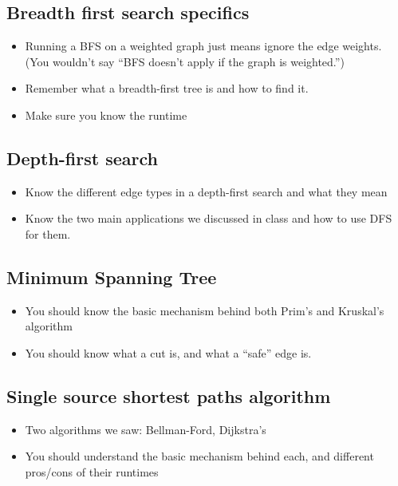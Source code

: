 \documentclass[11  pt]{exam}
\begin{document}
	\subsection{Breadth first search specifics}

	\begin{itemize}	
		\item Running a BFS on a weighted graph just means ignore the edge weights. (You wouldn't say ``BFS doesn't apply if the graph is weighted.'')
		\item Remember what a breadth-first tree is and how to find it.
		\item Make sure you know the runtime
	\end{itemize}


	\subsection{Depth-first search}
		\begin{itemize}	
			\item Know the different edge types in a depth-first search and what they mean
			\item Know the two main applications we discussed in class and how to use DFS for them.
		\end{itemize}

	\subsection{Minimum Spanning Tree}
\begin{itemize}	
	\item You should know the basic mechanism behind both Prim's and Kruskal's algorithm
	\item You should know what a cut is, and what a ``safe'' edge is.
\end{itemize}

	\subsection{Single source shortest paths algorithm}

\begin{itemize}	
	\item Two algorithms we saw: Bellman-Ford, Dijkstra's %
	\item You should understand the basic mechanism behind each, and different pros/cons of their runtimes
\end{itemize}
\end{document}
